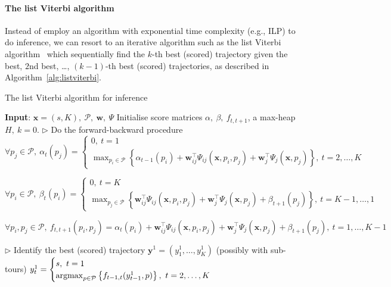 \paragraph{The list Viterbi algorithm}
Instead of employ an algorithm with exponential time complexity (e.g., ILP) to do inference,
we can resort to an iterative algorithm such as the list Viterbi algorithm~\cite{nilsson2001sequentially,seshadri1994list}
which sequentially find the $k$-th best (scored) trajectory given the best, $2$nd best, \dots, $(k-1)$-th best (scored) trajectories,
as described in Algorithm~\ref{alg:listviterbi}.


\begin{algorithm}[htbp]
\caption{The list Viterbi algorithm for inference}
\label{alg:listviterbi}
\begin{algorithmic}[1]
\STATE \textbf{Input}: $\mathbf{x}=(s, K),~ \mathcal{P},~ \mathbf{w},~ \Psi$
\STATE Initialise score matrices $\alpha,~ \beta,~ f_{t, t+1}$, a max-heap $H,~ k=0$.
\STATE $\triangleright$ Do the forward-backward procedure~\cite{rabiner1989tutorial}
\STATE $\forall p_j \in \mathcal{P},~ \alpha_t(p_j) = 
        \begin{cases}
        0,~ t = 1 \\
        \max_{p_i \in \mathcal{P}} \left\{ \alpha_{t-1}(p_i) + \mathbf{w}_{ij}^\top \Psi_{ij}(\mathbf{x}, p_i, p_j) + 
        \mathbf{w}_j^\top \Psi_j(\mathbf{x}, p_j) \right\},~ t=2,\dots,K
        \end{cases}$

\STATE $\forall p_i \in \mathcal{P},~ \beta_t(p_i) = 
        \begin{cases}
        0,~ t = K \\
        \max_{p_j \in \mathcal{P}} \left\{ \mathbf{w}_{ij}^\top \Psi_{ij}(\mathbf{x}, p_i, p_j) + 
        \mathbf{w}_j^\top \Psi_j(\mathbf{x}, p_j) + \beta_{t+1}(p_j) \right\},~ t = K-1,\dots,1
        \end{cases}$

\STATE $\forall p_i, p_j \in \mathcal{P},~ f_{t,t+1}(p_i, p_j) = \alpha_t(p_i) + \mathbf{w}_{ij}^\top \Psi_{ij}(\mathbf{x}, p_i, p_j) + 
                              \mathbf{w}_j^\top \Psi_j(\mathbf{x}, p_j) + \beta_{t+1}(p_j),~ t = 1,\dots,K-1$

\STATE $\triangleright$ Identify the best (scored) trajectory $\mathbf{y}^1=(y_1^1,\dots,y_K^1)$ (possibly with sub-tours)
\STATE $y_t^1 = \begin{cases}
                s,~ t = 1 \\
                \operatorname*{argmax}_{p \in \mathcal{P}} \left\{ f_{t-1,t}(y_{t-1}^1, p) \right\},~ t = 2,\dots,K
                \end{cases}$


\end{algorithmic}
\end{algorithm}
